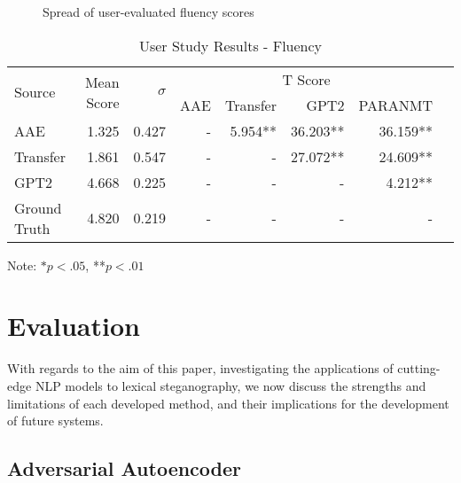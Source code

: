 \documentclass[12pt,a4paper]{article}
\begin{document}
\begin{figure}[h!]
  \centering
  
  \caption{Spread of user-evaluated fluency scores}
  \label{fluency}
\end{figure}



\begin{table}[h!]
\centering
  \vspace{4mm}
  \caption {User Study Results - Fluency} \label{fluencytable} 
  \vspace{2pt}
  \begin{tabular}{lrrrrrrr}
      \toprule
      \multirow{2}{*}{Source} &  \multirow{2}{*}{Mean Score} &  \multirow{2}{*}{$\sigma$} & \multicolumn{4}{c}{T Score}\\
      \cmidrule{4-7} 
      &&& AAE & Transfer & GPT2 & P{\footnotesize ARA}NMT\\
     \midrule
      AAE & 1.325 & 0.427      & - & 5.954** & 36.203** & 36.159** \\
      Transfer & 1.861 & 0.547      & - & -     & 27.072**  & 24.609** \\
      GPT2 & 4.668 & 0.225 & - & -     & -      & 4.212** \\
      Ground Truth & 4.820 & 0.219  & - & -     & -      & - \\
      \bottomrule
          \hline
  \end{tabular}
        \begin{flushright}
      \footnotesize{Note: $*p<.05$, **$p<.01$\hphantom{abcabaa}}
    \end{flushright}
    \vspace{-5mm}
\end{table}


\section{Evaluation}

\noindent With regards to the aim of this paper, investigating the applications of cutting-edge NLP models to lexical steganography, we now discuss the strengths and limitations of each developed method, and their implications for the development of future systems.


\subsection{Adversarial Autoencoder}
\end{document}
